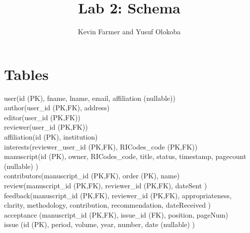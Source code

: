 \documentclass{article}
\title{Lab 2: Schema}
\author{Kevin Farmer and Yusuf Olokoba}
\begin{document}
\maketitle



\section*{Tables}

\medskip
user(id (PK), fname, lname, email, affiliation (nullable)) \\

author(user\_id (PK,FK), address) \\

editor(user\_id (PK,FK)) \\

reviewer(user\_id (PK,FK)) \\

affiliation(id (PK), institution) \\

interests(reviewer\_user\_id (PK,FK), RICodes\_code (PK,FK)) \\

manuscript(id (PK), owner, RICodes\_code, title, status, timestamp, pagecount (nullable) ) \\

contributors(manuscript\_id (PK,FK), order (PK), name) \\

review(manuscript\_id (PK,FK), reviewer\_id (PK,FK), dateSent ) \\

feedback(manuscript\_id (PK,FK), reviewer\_id (PK,FK), appropriateness, clarity, methodology, contribution, recommendation, dateReceived ) \\

acceptance (manuscript\_id (PK,FK), issue\_id (FK), position, pageNum) \\

issue (id (PK), period, volume, year, number, date (nullable) ) \\
\end{document}

